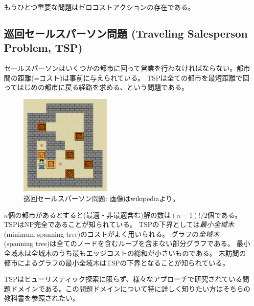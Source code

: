 \documentclass{report}
\begin{document}
もうひとつ重要な問題はゼロコストアクションの存在である。%




\subsection{巡回セールスパーソン問題 (Traveling Salesperson Problem, TSP)}

セールスパーソンはいくつかの都市に回って営業を行わなければならない。都市間の距離(=コスト)は事前に与えられている。
TSPは全ての都市を最短距離で回ってはじめの都市に戻る経路を求める、という問題である。

\begin{figure}
\centering
\includegraphics[width=0.4\textwidth]{figures/sokoban.pdf}%
\caption{巡回セールスパーソン問題: 画像はwikipediaより。}
\label{fig:sokoban}
\end{figure}


$n$個の都市があるとすると(最適・非最適含む)解の数は$(n-1)!/2$個である。
TSPはNP完全であることが知られている。
TSPの下界としては{\it 最小全域木} (minimum spanning tree)のコストがよく用いられる。
グラフの{\it 全域木} (spanning tree)は全てのノードを含むループを含まない部分グラフである。
最小全域木は全域木のうち最もエッジコストの総和が小さいものである。
未訪問の都市によるグラフの最小全域木はTSPの下界となることが知られている。

TSPはヒューリスティック探索に限らず、様々なアプローチで研究されている問題ドメインである\cite{applegate2006traveling}。この問題ドメインについて特に詳しく知りたい方はそちらの教科書を参照されたい。


\end{document}
